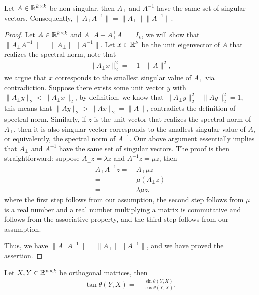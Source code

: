 \begin{lemma}
\label{lem:perp_inv_singular}
Let $A\in \mathbb{R}^{k\times k}$ be non-singular, then $A_\bot$ and $A^{-1}$ have the same set of singular vectors. Consequently, $\|A_\bot A^{-1}\|=\|A_\bot\|\|A^{-1}\|$. 

\end{lemma}

\begin{proof}
     Let $A\in \mathbb{R}^{k\times k}$ and $A^\top A+A_\bot^\top A_\bot=I_k$, we will show that $\|A_\bot A^{-1}\|=\|A_\bot \| \|A^{-1}\|$. Let $x\in \mathbb{R}^k$ be the unit eigenvector of $A$ that realizes the spectral norm, note that
\begin{align*}
    \|A_\bot x\|_2^2 = & ~ 1-\|A\|^2,
\end{align*}
we argue that $x$ corresponds to the smallest singular value of $A_\bot$ via contradiction. Suppose there exists some unit vector $y$ with $\|A_\bot y\|_2 < \|A_\bot x\|_2$, by definition, we know that $\|A_\bot y\|_2^2+\|Ay\|_2^2=1$, this means that $\|Ay\|_2>\|Ax\|_2=\|A\|$, contradicts the definition of spectral norm. Similarly, if $z$ is the unit vector that realizes the spectral norm of $A_\bot$, then it is also singular vector corresponds to the smallest singular value of $A$, or equivalently, the spectral norm of $A^{-1}$. Our above argument essentially implies that $A_\bot$ and $A^{-1}$ have the same set of singular vectors. The proof is then straightforward: suppose $A_\bot z=\lambda z$ and $A^{-1}z=\mu z$, then
\begin{align*}
    A_\bot A^{-1} z 
    = & ~ A_\bot \mu z \\
    = & ~ \mu (A_\bot z) \\
    = & ~ \lambda \mu z,
\end{align*}
where the first step follows from our assumption, the second step follows from $\mu$ is a real number and a real number multiplying a matrix is commutative and follows from the associative property, and the third step follows from our assumption.

Thus, we have $\|A_\bot A^{-1}\|=\|A_\bot\|\|A^{-1}\|$, and we have proved the assertion.
\end{proof}

\begin{lemma}\label{lem:tan_is_sin_cos}
Let $X, Y\in \mathbb{R}^{n\times k}$ be orthogonal matrices, then 
\begin{align*}
    \tan \theta(Y,X) = & ~ \frac{\sin \theta(Y,X)}{\cos \theta(Y,X)}.
\end{align*}
\end{lemma}


